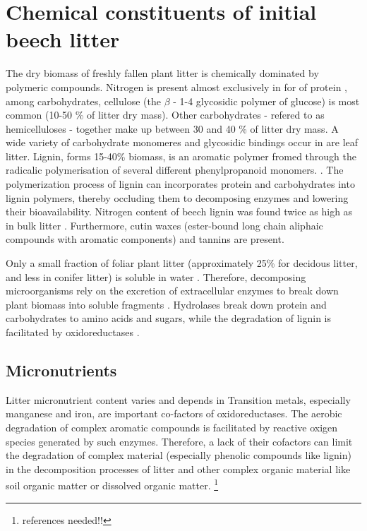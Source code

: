\section{Chemical constituents of initial beech litter}

The dry biomass of freshly fallen plant litter is chemically dominated by polymeric compounds. Nitrogen is present almost exclusively in for of protein \citep{Wanek2010}, among carbohydrates, cellulose (the $\beta$ - 1-4 glycosidic polymer of glucose) is most common (10-50 \% of litter dry mass). Other carbohydrates - refered to
 as hemicelluloses - together make up between 30 and 40 \% of litter dry mass. A wide variety of carbohydrate monomeres and glycosidic bindings occur in are leaf litter. Lignin, forms 15-40\% biomass, is an aromatic polymer fromed through the radicalic polymerisation of several different phenylpropanoid monomers. \citep[pp. 54f]{Berg2008}.  The polymerization process of lignin can incorporates protein and carbohydrates into lignin polymers, thereby occluding them to decomposing enzymes and lowering their bioavailability. Nitrogen content of beech lignin was found twice as high as in bulk litter \citep{Dykmans2002}. Furthermore, cutin waxes (ester-bound long chain aliphaic compounds with aromatic components) and tannins are present.

Only a small fraction of foliar plant litter (approximately 25\% for decidous litter, and less in conifer litter) is soluble in water \citep{Berg2008}. Therefore, decomposing microorganisms rely on the excretion of extracellular enzymes to break down plant biomass into soluble fragments \cite{Klotzbucher2011}. Hydrolases break down protein and carbohydrates to amino acids and sugars, while the degradation of lignin is facilitated by oxidoreductases \citep{Sinsabaugh2011}.

\subsection{Micronutrients}

Litter micronutrient content varies and depends in 
Transition metals, especially manganese and iron, are important co-factors of oxidoreductases. The aerobic degradation of complex aromatic compounds is facilitated by reactive oxigen species generated by such enzymes. Therefore, a lack of their cofactors can limit the degradation of complex material (especially phenolic compounds like lignin) in the decomposition processes of litter and other complex organic material like soil organic matter or dissolved organic matter. \footnote{references needed!!}

